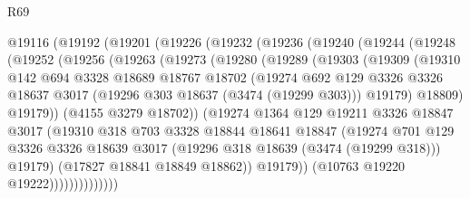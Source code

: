 \begin{lexlean}{R69}
\begin{coremodule}
    @19116
      (@19192
        (@19201
          (@19226
            (@19232
              (@19236
                (@19240
                  (@19244
                    (@19248
                      (@19252
                        (@19256
                          (@19263
                            (@19273
                              (@19280
                                (@19289
                                  (@19303
                                    (@19309
                                      (@19310
                                        @142
                                        @694
                                        @3328
                                        @18689
                                        @18767
                                        @18702
                                        (@19274
                                          @692
                                          @129
                                          @3326
                                          @3326
                                          @18637
                                          @3017
                                          (@19296 @303 @18637 (@3474 (@19299 @303)))
                                          @19179)
                                        @18809)
                                      @19179))
                                  (@4155 @3279 @18702))
                                (@19274
                                  @1364
                                  @129
                                  @19211
                                  @3326
                                  @18847
                                  @3017
                                  (@19310
                                    @318
                                    @703
                                    @3328
                                    @18844
                                    @18641
                                    @18847
                                    (@19274
                                      @701
                                      @129
                                      @3326
                                      @3326
                                      @18639
                                      @3017
                                      (@19296 @318 @18639 (@3474 (@19299 @318)))
                                      @19179)
                                    (@17827 @18841 @18849 @18862))
                                  @19179))
                              (@10763 @19220 @19222))))))))))))))

\end{coremodule}
\end{lexlean}
